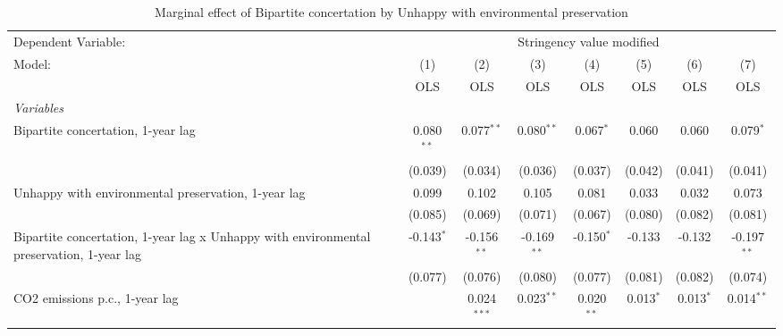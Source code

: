 
\begin{table}[htbp]
   \caption{Marginal effect of Bipartite concertation by Unhappy with environmental preservation}
   \centering
   \begin{tabular}{lccccccc}
      \toprule
      Dependent Variable: & \multicolumn{7}{c}{Stringency value modified}\\
      Model:                                                                                   & (1)          & (2)           & (3)           & (4)           & (5)           & (6)           & (7)\\  
                                                                                               &  OLS         & OLS           & OLS           & OLS           & OLS           & OLS           & OLS\\  
      \midrule
      \emph{Variables}\\
      Bipartite concertation, 1-year lag                                                       & 0.080$^{**}$ & 0.077$^{**}$  & 0.080$^{**}$  & 0.067$^{*}$   & 0.060         & 0.060         & 0.079$^{*}$\\   
                                                                                               & (0.039)      & (0.034)       & (0.036)       & (0.037)       & (0.042)       & (0.041)       & (0.041)\\   
      Unhappy with environmental preservation, 1-year lag                                      & 0.099        & 0.102         & 0.105         & 0.081         & 0.033         & 0.032         & 0.073\\   
                                                                                               & (0.085)      & (0.069)       & (0.071)       & (0.067)       & (0.080)       & (0.082)       & (0.081)\\   
      Bipartite concertation, 1-year lag x Unhappy with environmental preservation, 1-year lag & -0.143$^{*}$ & -0.156$^{**}$ & -0.169$^{**}$ & -0.150$^{*}$  & -0.133        & -0.132        & -0.197$^{**}$\\   
                                                                                               & (0.077)      & (0.076)       & (0.080)       & (0.077)       & (0.081)       & (0.082)       & (0.074)\\   
      CO2 emissions p.c., 1-year lag                                                           &              & 0.024$^{***}$ & 0.023$^{**}$  & 0.020$^{**}$  & 0.013$^{*}$   & 0.013$^{*}$   & 0.014$^{**}$\\   

\end{tabular}
\end{table}
